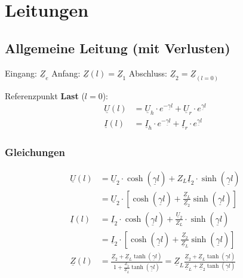 \section{Leitungen}

\subsection{Allgemeine Leitung (mit Verlusten)}


Eingang: $ \underline{Z}_e $ \quad Anfang: $ \underline{Z}(l) = \underline{Z}_1 $ \quad
Abschluss: $ \underline{Z}_2 = \underline{Z}_{(l=0)}$

Referenzpunkt \textbf{Last} ($ l=0 $):
\begin{align*}
	\underline{U}(l) & = \underline{U}_h \cdot e^{-\underline{\gamma}l} + \underline{U}_r \cdot e^{\underline{\gamma} l}  \\
	\underline{I}(l) & = \underline{I}_h \cdot e^{-\underline{\gamma} l} + \underline{I}_r \cdot e^{\underline{\gamma} l}
\end{align*}

\subsubsection{Gleichungen}\label{sec:Leitungen_allg_Gleichungen}
\begin{align*}
	\underline{U}(l) & = \underline{U}_2 \cdot \cosh(\underline{\gamma}l) + Z_L \underline{I}_2 \cdot \sinh(\underline{\gamma}l)                                 \\
	                 & = \underline{U}_2 \cdot \left[ \cosh(\underline{\gamma} l) + \tfrac{\underline{Z}_L}{\underline{Z}_2} \sinh(\underline{\gamma} l) \right] \\
	\underline{I}(l) & = \underline{I}_2 \cdot \cosh(\underline{\gamma}l) + \frac{\underline{U}_2}{Z_L} \cdot \sinh(\underline{\gamma}l)                         \\
	                 & = \underline{I}_2 \cdot \left[ \cosh(\underline{\gamma} l) + \tfrac{\underline{Z}_2}{\underline{Z}_L} \sinh(\underline{\gamma} l) \right] \\
	\underline{Z}(l) & = \frac{\underline{Z}_2+ \underline{Z}_L\tanh(\underline{\gamma}
		l)}{1+\frac{\underline{Z}_2}{\underline{Z}_L}\tanh(\underline{\gamma} l)} =
	\underline{Z}_L \frac{\underline{Z}_2+ \underline{Z}_L\tanh(\underline{\gamma}
	l)}{{\underline{Z}_L}+{\underline{Z}_2}\tanh(\underline{\gamma} l)}
\end{align*}

